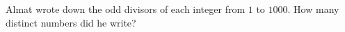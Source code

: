 Almat wrote down the odd divisors of each integer from $1$ to $1000$. How many distinct numbers did he write?
